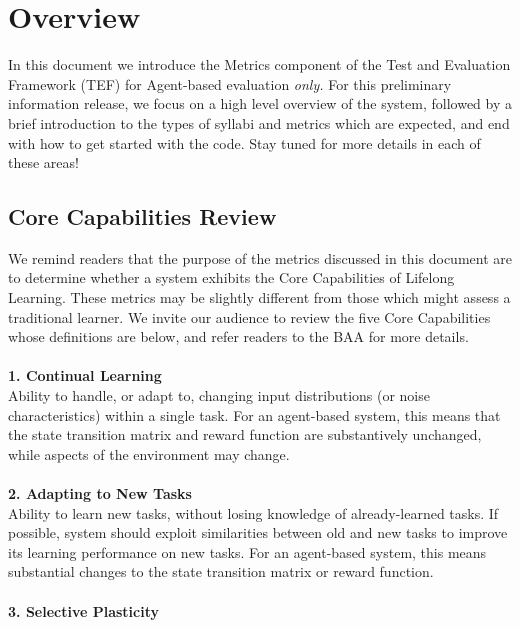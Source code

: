 \chapter{Overview}\label{ch:overview}

In this document we introduce the Metrics component of the Test and Evaluation Framework (TEF) for Agent-based evaluation \textit{only.} For this preliminary information release, we focus on a high level overview of the system, followed by a brief introduction to the types of syllabi and metrics which are expected, and end with how to get started with the code. Stay tuned for more details in each of these areas!

\section*{Core Capabilities Review}
\label{sec:core_capabilities}

We remind readers that the purpose of the metrics discussed in this document are to determine whether a system exhibits the Core Capabilities of Lifelong Learning. These metrics may be slightly different from those which might assess a traditional learner. We invite our audience to review the five Core Capabilities whose definitions are below, and refer readers to the BAA for more details.\\%
\\
\textbf{1. Continual Learning}\\

Ability to handle, or adapt to, changing input distributions (or noise characteristics) within a single task. For an agent-based system, this means that the state transition matrix and reward function are substantively unchanged, while aspects of the environment may change.\\
\\
\textbf{2. Adapting to New Tasks}\\

Ability to learn new tasks, without losing knowledge of already-learned tasks. If possible, system should exploit similarities between old and new tasks to improve its learning performance on new tasks. For an agent-based system, this means substantial changes to the state transition matrix or reward function.\\
\\
\textbf{3. Selective Plasticity}\\

